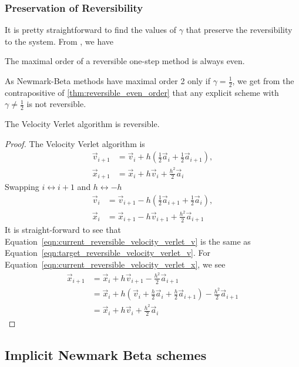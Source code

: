 \documentclass[../Main.tex]{subfiles}
\begin{document}
\subsubsection{Preservation of Reversibility}
It is pretty straightforward to find the values of $\gamma$ that preserve the reversibility to the system. From \cite{Paganini2017}, we have
\begin{theorem}The maximal order of a reversible one-step method is always even. \label{thm:reversible_even_order} \end{theorem}
 As Newmark-Beta methods have maximal order 2 only if $\gamma = \frac{1}{2}$, we get from the contrapositive of \ref{thm:reversible_even_order} that any explicit scheme with $\gamma \neq \frac{1}{2}$ is not reversible.
\begin{claim} The Velocity Verlet algorithm is reversible. \end{claim}
\begin{proof}
The Velocity Verlet algorithm is
\begin{align}
		\vec{v}_{i+1} & = \vec{v}_{i} + h\left(\frac{1}{2}\vec{a}_{i} + \frac{1}{2}\vec{a}_{i+1}\right), \label{eqn:target_reversible_velocity_verlet_v}\\
		\vec{x}_{i+1} & = \vec{x}_{i} + h\vec{v}_{i} + \frac{h^2}{2}\vec{a}_{i} \label{eqn:target_reversible_velocity_verlet_x} 
\end{align}
Swapping $i \leftrightarrow i+1$ and $h \leftrightarrow -h$
\begin{align}
		\vec{v}_{i} & = \vec{v}_{i+1} - h\left(\frac{1}{2}\vec{a}_{i+1} + \frac{1}{2}\vec{a}_{i}\right),  \label{eqn:current_reversible_velocity_verlet_v}\\
		\vec{x}_{i} & = \vec{x}_{i+1} - h\vec{v}_{i+1} + \frac{h^2}{2}\vec{a}_{i+1} \label{eqn:current_reversible_velocity_verlet_x} 
\end{align}
It is straight-forward to see that Equation~\ref{eqn:current_reversible_velocity_verlet_v} is the same as Equation~\ref{eqn:target_reversible_velocity_verlet_v}.
For Equation~\ref{eqn:current_reversible_velocity_verlet_x}, we see
\begin{align*}
	\vec{x}_{i+1} & = \vec{x}_{i} + h\vec{v}_{i+1} - \frac{h^2}{2}\vec{a}_{i+1} \\
	& = \vec{x}_{i} + h\left(\vec{v}_{i} + \frac{h}{2}\vec{a}_{i} + \frac{h}{2}\vec{a}_{i+1}\right) - \frac{h^2}{2}\vec{a}_{i+1} \\
	& = \vec{x}_{i} + h\vec{v}_{i} + \frac{h^2}{2}\vec{a}_{i}
\end{align*} 
\end{proof} 


\subsection{Implicit Newmark Beta schemes}
\end{document}
